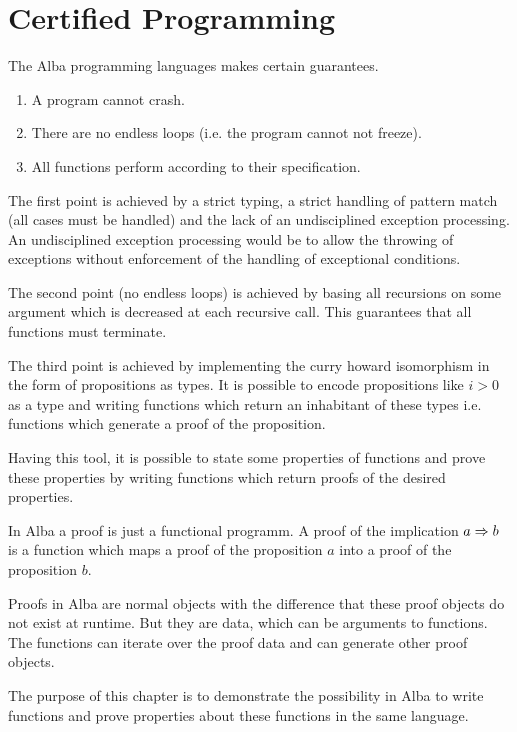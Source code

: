 \chapter{Certified Programming}
\label{chap:certprog}


The Alba programming languages makes certain guarantees.
\begin{enumerate}
\item A program cannot crash.

\item There are no endless loops (i.e. the program cannot not freeze).

\item All functions perform according to their specification.
\end{enumerate}

The first point is achieved by a strict typing, a strict handling of pattern
match (all cases must be handled) and the lack of an undisciplined exception
processing. An undisciplined exception processing would be to allow the
throwing of exceptions without enforcement of the handling of exceptional
conditions.

The second point (no endless loops) is achieved by basing all recursions on
some argument which is decreased at each recursive call. This guarantees that
all functions must terminate.

The third point is achieved by implementing the curry howard isomorphism in
the form of propositions as types. It is possible to encode propositions like
$i > 0$ as a type and writing functions which return an inhabitant of these
types i.e. functions which generate a proof of the proposition.

Having this tool, it is possible to state some properties of functions and
prove these properties by writing functions which return proofs of the
desired properties.

In Alba a proof is just a functional programm. A proof of the implication $a
\Rightarrow b$ is a function which maps a proof of the proposition $a$ into a proof
of the proposition $b$.

Proofs in Alba are normal objects with the difference that these proof objects
do not exist at runtime. But they are data, which can be arguments to
functions. The functions can iterate over the proof data and can generate
other proof objects.

The purpose of this chapter is to demonstrate the possibility in Alba to write
functions and prove properties about these functions in the same language.




